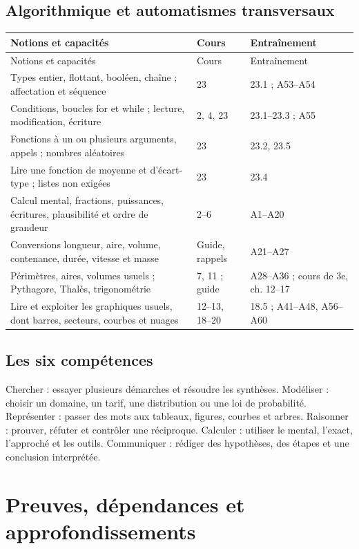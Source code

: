 \documentclass[11pt,a4paper,oneside]{book}
\begin{document}
\section{Algorithmique et automatismes transversaux}
\small
\begin{longtable}{p{}p{}p{}}
\toprule Notions et capacités & Cours & Entraînement\\\midrule
\endfirsthead\toprule Notions et capacités & Cours & Entraînement\\\midrule\endhead
Types entier, flottant, booléen, chaîne ; affectation et séquence & 23 & 23.1 ; A53--A54\\
Conditions, boucles for et while ; lecture, modification, écriture & 2, 4, 23 & 23.1--23.3 ; A55\\
Fonctions à un ou plusieurs arguments, appels ; nombres aléatoires & 23 & 23.2, 23.5\\
Lire une fonction de moyenne et d'écart-type ; listes non exigées & 23 & 23.4\\
Calcul mental, fractions, puissances, écritures, plausibilité et ordre de grandeur & 2--6 & A1--A20\\
Conversions longueur, aire, volume, contenance, durée, vitesse et masse & Guide, rappels & A21--A27\\
Périmètres, aires, volumes usuels ; Pythagore, Thalès, trigonométrie & 7, 11 ; guide & A28--A36 ; cours de 3e, ch. 12--17\\
Lire et exploiter les graphiques usuels, dont barres, secteurs, courbes et nuages & 12--13, 18--20 & 18.5 ; A41--A48, A56--A60\\
\bottomrule\end{longtable}
\normalsize

\section{Les six compétences}
Chercher : essayer plusieurs démarches et résoudre les synthèses.
Modéliser : choisir un domaine, un tarif, une distribution ou une loi de probabilité.
Représenter : passer des mots aux tableaux, figures, courbes et arbres.
Raisonner : prouver, réfuter et contrôler une réciproque.
Calculer : utiliser le mental, l'exact, l'approché et les outils.
Communiquer : rédiger des hypothèses, des étapes et une conclusion interprétée.
\chapter{Preuves, dépendances et approfondissements}
\end{document}

